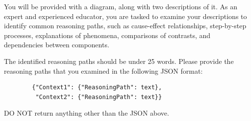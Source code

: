 \centering
\begin{tcolorbox}[
    colback=white,
    colframe=gray!20,
    arc=10pt,
    boxrule=1pt,
    title={\textcolor{white}{\textbf{Prompts for Reasoning Path Generation}}},
    coltitle=white,
    fonttitle=\large,
    colbacktitle=black!70,
]

You will be provided with a diagram, along with two descriptions of it. As an expert and experienced educator, you are tasked to examine your descriptions to identify common reasoning paths, such as cause-effect relationships, step-by-step processes, explanations of phenomena, comparisons of contrasts, and dependencies between components.

The identified reasoning paths should be under 25 words. Please provide the reasoning paths that you examined in the following JSON format:

\begin{verbatim}
        {"Context1": {"ReasoningPath": text},
         "Context2": {"ReasoningPath": text}}
\end{verbatim}

DO NOT return anything other than the JSON above.
\end{tcolorbox}

